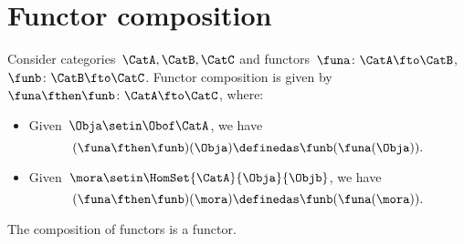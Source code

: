 
\section{Functor composition}
\begin{ctdefinition}
    \label{def:functor_composition}
    Consider categories~$\CatA,\CatB,\CatC$ and functors~$\funa\colon \CatA\fto \CatB$,~$\funb \colon \CatB\fto \CatC$.
    Functor composition is given by~$\funa\fthen \funb\colon \CatA \fto \CatC$, where:
    \begin{itemize}
        \item Given~$\Obja\setin \Obof\CatA$, we have
              \begin{equation}
                  (\funa\fthen \funb)(\Obja)
                  \definedas\funb(\funa(\Obja)).
              \end{equation}
        \item Given~$\mora \setin \HomSet{\CatA}{\Obja}{\Objb}$, we have
              \begin{equation}
                  (\funa\fthen \funb)(\mora)
                  \definedas \funb(\funa(\mora)).
              \end{equation}
    \end{itemize}
\end{ctdefinition}

\begin{lemma}
    \label{lem:functors_compose}
    The composition of functors is a functor.
\end{lemma}


